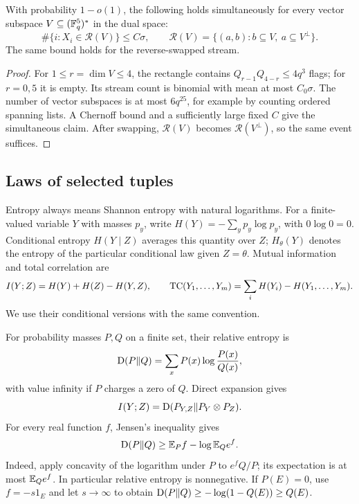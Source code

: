 \begin{lemma}
\label{lem:rectangles}
With probability \(1-o(1)\), the following holds simultaneously
for every vector subspace \(V\subseteq(\mathbb F_q^5)^*\) in the dual space:
\[
 \#\{i:X_i\in\mathcal R(V)\}\le C\sigma,\qquad
 \mathcal R(V)=\{(a,b):b\subseteq V,\ a\subseteq V^\perp\}.
\]
The same bound holds for the reverse-swapped stream.
\end{lemma}
\begin{proof}
For \(1\le r=\dim V\le4\), the rectangle contains
\(Q_{r-1}Q_{4-r}\le4q^3\) flags; for \(r=0,5\) it is empty.
Its stream count is binomial with mean at most \(C_0\sigma\).
The number of vector subspaces is at most \(6q^{25}\), for example
by counting ordered spanning lists. A Chernoff bound and a sufficiently
large fixed \(C\) give the simultaneous claim.
After swapping, \(\mathcal R(V)\) becomes
\(\mathcal R(V^\perp)\), so the same event suffices.
\end{proof}

\subsection{Laws of selected tuples}

Entropy always means Shannon entropy with natural logarithms.
For a finite-valued variable \(Y\) with masses \(p_y\), write
\(H(Y)=-\sum_y p_y\log p_y\), with \(0\log0=0\).
Conditional entropy \(H(Y\mid Z)\) averages this quantity over \(Z\);
\(H_\theta(Y)\) denotes the entropy of the particular conditional law
given \(Z=\theta\). Mutual information and total correlation are
\[
 I(Y;Z)=H(Y)+H(Z)-H(Y,Z),\qquad
 \operatorname{TC}(Y_1,\ldots,Y_m)=\sum_iH(Y_i)-H(Y_1,\ldots,Y_m).
\]
We use their conditional versions with the same convention.

For probability masses \(P,Q\) on a finite set, their relative entropy is
\[
 \operatorname{D}(P\Vert Q)=\sum_xP(x)\log\frac{P(x)}{Q(x)},
\]
with value infinity if \(P\) charges a zero of \(Q\). Direct expansion gives
\[
 I(Y;Z)=\operatorname{D}(P_{Y,Z}\Vert P_Y\otimes P_Z).
\]
For every real function \(f\), Jensen's inequality gives
\begin{equation}\label{eq:entropy-variational}
 \operatorname{D}(P\Vert Q)\ge \mathbb E_P f-\log\mathbb E_Q e^f.
\end{equation}
Indeed, apply concavity of the logarithm under \(P\) to
\(e^fQ/P\); its expectation is at most \(\mathbb E_Q e^f\).
In particular relative entropy is nonnegative. If \(P(E)=0\),
use \(f=-s1_E\) and let \(s\to\infty\) to obtain
\(\operatorname{D}(P\Vert Q)\ge-\log(1-Q(E))\ge Q(E)\).

